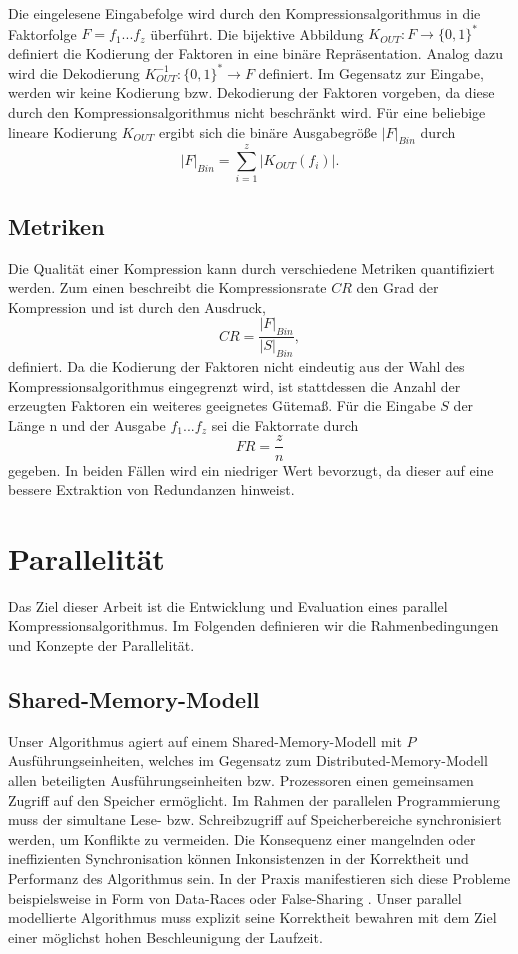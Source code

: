 Die eingelesene Eingabefolge wird durch den Kompressionsalgorithmus in die Faktorfolge $F=f_1...f_z$ überführt. Die bijektive Abbildung $K_{OUT}: F \rightarrow \{0,1\}^*$
definiert die Kodierung der Faktoren in eine binäre Repräsentation. Analog dazu wird die Dekodierung $K^{-1}_{OUT}: \{0,1\}^* \rightarrow F$ definiert. Im Gegensatz zur Eingabe, 
werden wir keine Kodierung bzw. Dekodierung der Faktoren vorgeben, da diese durch den Kompressionsalgorithmus nicht beschränkt wird. Für eine beliebige lineare Kodierung $K_{OUT}$
ergibt sich die binäre Ausgabegröße $|F|_{Bin}$ durch
\begin{equation}
    |F|_{Bin} = \sum_{i=1}^{z} |K_{OUT}(f_i)|.
\end{equation}

\subsection{Metriken}
Die Qualität einer Kompression kann durch verschiedene Metriken quantifiziert werden. Zum einen beschreibt die Kompressionsrate $CR$ den Grad der Kompression und ist durch den
Ausdruck, 
\begin{equation}
    CR = \frac{|F|_{Bin}}{|S|_{Bin}},
\end{equation}
definiert.
Da die Kodierung der Faktoren nicht eindeutig aus der Wahl des Kompressionsalgorithmus eingegrenzt wird, ist stattdessen die Anzahl der erzeugten Faktoren ein
weiteres geeignetes Gütemaß. Für die Eingabe $S$ der Länge n und der Ausgabe $f_1...f_z$ sei die Faktorrate durch
\begin{equation}
    FR = \frac{z}{n}
\end{equation}
gegeben. In beiden Fällen wird ein niedriger Wert bevorzugt, da dieser auf eine bessere Extraktion von Redundanzen hinweist.

\section{Parallelität}
Das Ziel dieser Arbeit ist die Entwicklung und Evaluation eines parallel Kompressionsalgorithmus. Im Folgenden definieren wir die Rahmenbedingungen und Konzepte der Parallelität.

\subsection{Shared-Memory-Modell} \label{shared}
Unser Algorithmus agiert auf einem Shared-Memory-Modell \cite{jaja} mit $P$ Ausführungseinheiten, welches im Gegensatz zum Distributed-Memory-Modell allen beteiligten 
Ausführungseinheiten bzw. Prozessoren einen gemeinsamen Zugriff auf den Speicher ermöglicht. Im Rahmen der parallelen Programmierung muss der simultane Lese- bzw. Schreibzugriff auf
Speicherbereiche synchronisiert werden, um Konflikte zu vermeiden. Die Konsequenz einer mangelnden oder ineffizienten Synchronisation können Inkonsistenzen in der Korrektheit und
Performanz des Algorithmus sein. In der Praxis manifestieren sich diese Probleme beispielsweise in Form von Data-Races oder False-Sharing \cite{parallelcomputing}. 
Unser parallel modellierte Algorithmus muss explizit seine Korrektheit bewahren mit dem Ziel einer möglichst hohen Beschleunigung der Laufzeit.

